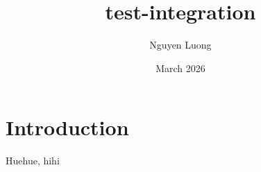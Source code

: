 \documentclass{article}
\title{test-integration}
\author{Nguyen Luong}
\date{March 2026}
\begin{document}
\maketitle

\section{Introduction}
Huehue, hihi
\end{document}
